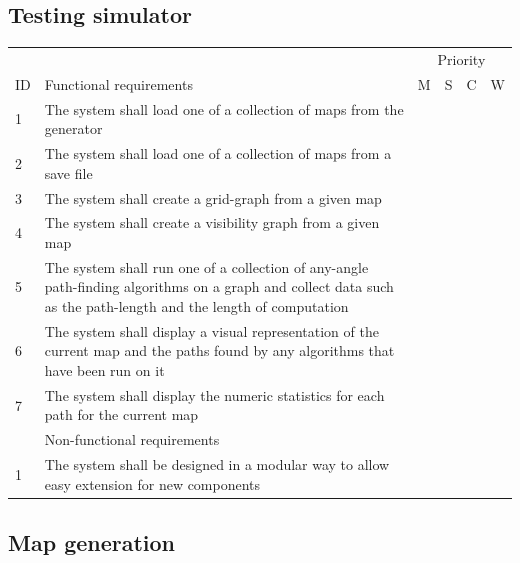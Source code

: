 \documentclass[12pt,notitlepage]{report}
\begin{document}
\subsection{Testing simulator}

\begin{center}
\begin{tabular}{@{}l p{10cm} cccc} \toprule
\multicolumn{2}{r}{~} &\multicolumn{4}{c}{Priority} \\ 
\cmidrule(l){3-6}
ID & Functional requirements & M & S & C & W  \\ \midrule
    1 & The system shall load one of a collection of maps from the generator & \cellcolor{green!60} & ~ & ~ & ~\\
    2 & The system shall load one of a collection of maps from a save file & ~ & \cellcolor{yellow!80} & ~ & ~ \\    
   3 & The system shall create a grid-graph from a given map & \cellcolor{green!60} & ~ & ~ & ~\\
   4 & The system shall create a visibility graph from a given map & ~ & ~ & \cellcolor{orange!60} & ~\\
   5 & The system shall run one of a collection of any-angle path-finding algorithms on a graph and collect data such as the path-length and the length of computation & \cellcolor{green!60} & ~ & ~ & ~\\
    6 & The system shall display a visual representation of the current map and the paths found by any algorithms that have been run on it & \cellcolor{green!60} & ~ & ~ & ~\\
    7 & The system shall display the numeric statistics for each path for the current map & \cellcolor{green!60} & ~ & ~ & ~\\
    \midrule
    ~ & Non-functional requirements & \multicolumn{4}{r}{}  \\ \midrule
    1 & The system shall be designed in a modular way to allow easy extension for new components & ~ & \cellcolor{yellow!80} & ~ & ~ \\  \bottomrule
\end{tabular}
\end{center}

\subsection{Map generation}
\end{document}
